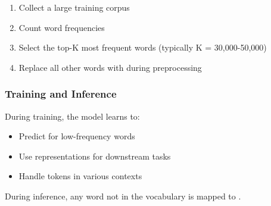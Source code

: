 \begin{enumerate}
\item Collect a large training corpus
\item Count word frequencies
\item Select the top-K most frequent words (typically K = 30,000-50,000)
\item Replace all other words with \unk{} during preprocessing
\end{enumerate}

\subsubsection{Training and Inference}
During training, the model learns to:
\begin{itemize}
\item Predict \unk{} for low-frequency words
\item Use \unk{} representations for downstream tasks
\item Handle \unk{} tokens in various contexts
\end{itemize}

During inference, any word not in the vocabulary is mapped to \unk{}.


